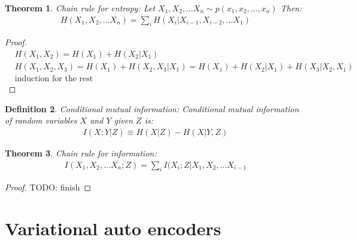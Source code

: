 \documentclass[11pt]{book}
\newtheorem{theorem}{Theorem}
\newtheorem{definition}[theorem]{Definition}
\renewcommand{\H}{\ensuremath{H}}
\newcommand{\I}{\ensuremath{I}}
\begin{document}
\begin{theorem}
    Chain rule for entropy: Let $X_1, X_2, \dots X_n \sim p(x_1, x_2, \dots, x_n)$
    Then:
    \begin{align*}
        \H(X_1, X_2, \dots X_n) = \sum_i \H(X_i | X_{i-1}, X_{i-2}, \dots X_1)
    \end{align*}
\end{theorem}
\begin{proof}
    \begin{align*}
    &\H(X_1, X_2) = \H(X_1) + \H(X_2 | X_1) \\
    &\H(X_1, X_2, X_3) = \H(X_1) + \H(X_2, X_3 | X_1) = \H(X_1) + H(X_2 | X_1) + H(X_3 | X_2, X_1) \\
    &\text{induction for the rest}
    \end{align*}
\end{proof}

\begin{definition}
    Conditional mutual information: Conditional mutual information of random
    variables $X$ and $Y$ given $Z$ is:
    \begin{align*}
        \I(X; Y | Z) \equiv \H(X|Z) - \H(X|Y, Z)
    \end{align*}
\end{definition}

\begin{theorem}
    Chain rule for information:
    \begin{align*}
        \I(X_1, X_2, \dots X_n ; Z) = \sum_i I(X_i ; Z | X_1, X_2, \dots X_{i - 1}
    \end{align*}
\end{theorem}
\begin{proof}
    TODO: finish
\end{proof}

\chapter{Variational auto encoders}
\end{document}
